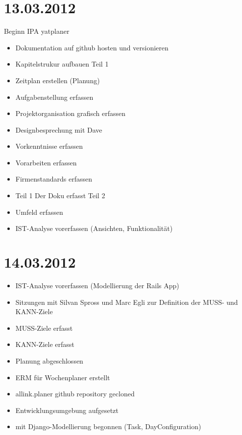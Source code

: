 \section{13.03.2012}
Beginn IPA yatplaner
\begin{itemize}
    \item Dokumentation auf github hosten und versionieren
    \item Kapitelstrukur aufbauen 
    Teil 1\\
    \item Zeitplan erstellen (Planung)
    \item Aufgabenstellung erfassen
    \item Projektorganisation grafisch erfassen
    \item Designbesprechung mit Dave
    \item Vorkenntnisse erfassen
    \item Vorarbeiten erfassen
    \item Firmenstandards erfassen
    \item Teil 1 Der Doku erfasst
    Teil 2\\
    \item Umfeld erfassen
    \item IST-Analyse vorerfassen (Ansichten, Funktionalität)
\end{itemize}
\section{14.03.2012}
\begin{itemize}
    \item IST-Analyse vorerfassen (Modellierung der Rails App)
    \item Sitzungen mit Silvan Spross und Marc Egli zur Definition der MUSS- und KANN-Ziele
    \item MUSS-Ziele erfasst
    \item KANN-Ziele erfasst
    \item Planung abgeschlossen
    \item ERM für Wochenplaner erstellt
    \item allink.planer github repository gecloned
    \item Entwicklungsumgebung aufgesetzt
    \item mit Django-Modellierung begonnen (Task, DayConfiguration)
\end{itemize}
